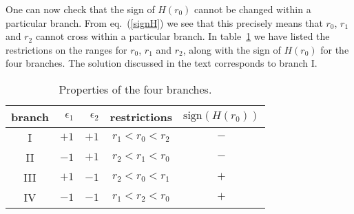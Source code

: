 \documentclass[a4paper,11pt]{article}
\newcommand{\eqref}[1]{(\ref{#1})}
\begin{document}
One can now check that the sign of $H(r_0)$ cannot be changed within a
particular branch. From eq.~\eqref{signH} we see that this precisely
means that $r_0$, $r_1$ and $r_2$ cannot cross within a particular
branch. In table~\ref{tabbranches} we have listed the restrictions on
the ranges for $r_0$, $r_1$ and $r_2$, along with the sign of $H(r_0)$
for the four branches. The solution discussed in the text corresponds
to branch I.

\begin{table}
\begin{center}
\begin{tabular}{|c|r|r|c|c|}
\hline branch & $\epsilon_1$ & $\epsilon_2$ & restrictions &
$\mathrm{sign}(H(r_0))$\\ \hline {\rm I} & $+1$ & $+1$ & $r_1 < r_0 <
r_2 $ & $-$ \\ {\rm II} & $-1$ & $+1$ & $r_2 < r_1 < r_0 $ & $-$ \\
{\rm III} & $+1$ & $-1$ & $r_2 < r_0 < r_1 $ & $+$ \\ {\rm IV} & $-1$
& $-1$ & $r_1 < r_2 < r_0 $ & $+$ \\ \hline
\end{tabular}
\caption{Properties of the four branches.\label{tabbranches}}
\end{center}
\end{table}
\end{document}
